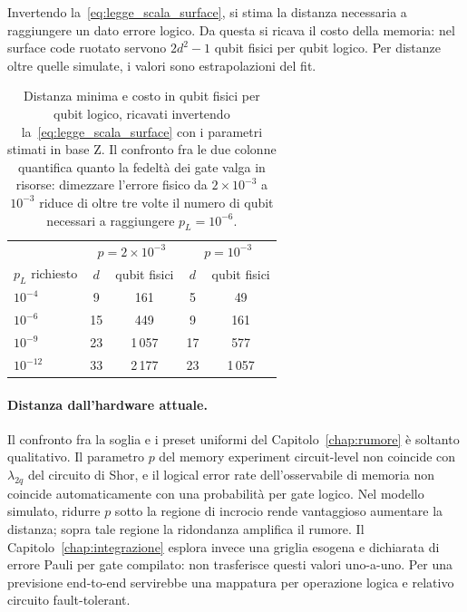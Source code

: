 \begin{onehalfspace}
Invertendo la~\eqref{eq:legge_scala_surface}, si stima la distanza necessaria a raggiungere un dato errore logico. Da questa si ricava il costo della memoria: nel surface code ruotato servono $2d^2 - 1$ qubit fisici per qubit logico. Per distanze oltre quelle simulate, i valori sono estrapolazioni del fit.

\begin{table}[H]
\centering
\caption[Distanza e costo in qubit richiesti dalla legge di scala]{Distanza minima e costo in qubit fisici per qubit logico, ricavati invertendo la~\eqref{eq:legge_scala_surface} con i parametri stimati in base Z. Il confronto fra le due colonne quantifica quanto la fedeltà dei gate valga in risorse: dimezzare l'errore fisico da $2\times10^{-3}$ a $10^{-3}$ riduce di oltre tre volte il numero di qubit necessari a raggiungere $p_L = 10^{-6}$.}
\label{tab:distanza_richiesta}
\begin{tabular}{lcccc}
\hline
 & \multicolumn{2}{c}{$p = 2\times10^{-3}$} & \multicolumn{2}{c}{$p = 10^{-3}$} \\
$p_L$ richiesto & $d$ & qubit fisici & $d$ & qubit fisici \\
\hline
$10^{-4}$  & \phantom{0}9 & \phantom{0}161 & \phantom{0}5 & \phantom{00}49 \\
$10^{-6}$  & 15 & \phantom{0}449 & \phantom{0}9 & \phantom{0}161 \\
$10^{-9}$  & 23 & 1\,057 & 17 & \phantom{0}577 \\
$10^{-12}$ & 33 & 2\,177 & 23 & 1\,057 \\
\hline
\end{tabular}
\end{table}

\paragraph{Distanza dall'hardware attuale.}
Il confronto fra la soglia e i preset uniformi del Capitolo~\ref{chap:rumore} è soltanto qualitativo. Il parametro $p$ del memory experiment circuit-level non coincide con $\lambda_{2q}$ del circuito di Shor, e il logical error rate dell'osservabile di memoria non coincide automaticamente con una probabilità per gate logico. Nel modello simulato, ridurre $p$ sotto la regione di incrocio rende vantaggioso aumentare la distanza; sopra tale regione la ridondanza amplifica il rumore. Il Capitolo~\ref{chap:integrazione} esplora invece una griglia esogena e dichiarata di errore Pauli per gate compilato: non trasferisce questi valori uno-a-uno. Per una previsione end-to-end servirebbe una mappatura per operazione logica e relativo circuito fault-tolerant.


\end{onehalfspace}
